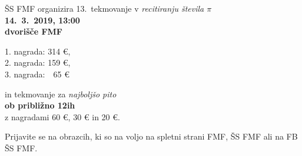 \documentclass[a4paper,oneside,12pt]{article}
\title{\Title}
\author{\Author}
\date{\today}
\theoremstyle{definition}
\begin{document}
  \thispagestyle{empty}  %

  \vspace*{-9ex}

  \begin{flushright}
    \hspace*{-1cm}
  \end{flushright}

  \vspace{3ex}

  \begin{center}
    \fontsize{14}{24}\selectfont
    ŠS FMF organizira 13.\ tekmovanje v \emph{recitiranju števila $\pi$} \\[-10pt]
    \fontsize{60}{64}\selectfont
    \bf
    14.\ 3.\ 2019, 13:00 \\[-1.5ex]
    dvorišče FMF
  \end{center}

  \setlength{\parskip}{10pt}
  \fontsize{20}{24}\selectfont

  \hspace*{4.5cm}  1. nagrada: 314 \euro, \\
  \hspace*{4.5cm}  2. nagrada: 159 \euro, \\
  \hspace*{4.5cm}  3. nagrada: \ \,65 \euro \\[-30px]

  \fontsize{14}{24}\selectfont
  \begin{center}
    in tekmovanje za \emph{najboljšo pito} \\[10px]
    \fontsize{30}{34}\selectfont
    {\bf
      ob približno 12ih \\[12px]
    }
    \fontsize{20}{24}\selectfont
    z nagradami 60 \euro, 30 \euro{} in 20 \euro.
  \end{center}

  \vspace{-1ex}

  {\small
    Prijavite se na obrazcih, ki so na voljo na spletni strani FMF, ŠS FMF ali na FB ŠS FMF.}


\end{document}
